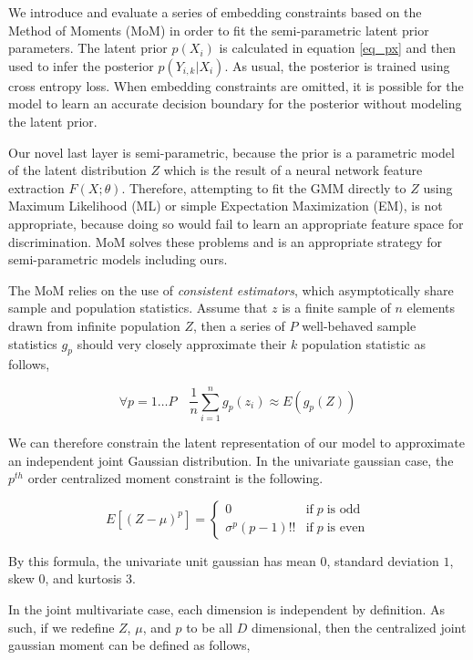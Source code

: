\documentclass[10pt,twocolumn,letterpaper]{article}
\begin{document}
We introduce and evaluate a series of embedding constraints based on the Method of Moments (MoM) \cite{pearson1936method} in order to fit the semi-parametric latent prior parameters.  
The latent prior $p(X_i)$ is calculated in equation \ref{eq_px} and then used to infer the posterior $p(Y_{i,k}|X_i)$.
As usual, the posterior is trained using cross entropy loss.  
When embedding constraints are omitted, it is possible for the model to learn an accurate decision boundary for the posterior without modeling the latent prior.

Our novel last layer is semi-parametric, because the prior is a parametric model of the latent distribution $Z$ which is the result of a neural network feature extraction $F(X;\theta)$. 
Therefore, attempting to fit the GMM directly to $Z$ using Maximum Likelihood (ML) or simple Expectation Maximization (EM), is not appropriate, because doing so would fail to learn an appropriate feature space for discrimination.
MoM solves these problems and is an appropriate strategy for semi-parametric models including ours.

The MoM relies on the use of \textit{consistent estimators}, which asymptotically share sample and population statistics.
Assume that $z$ is a finite sample of $n$ elements drawn from infinite population $Z$, then a series of $P$ well-behaved sample statistics $g_p$ should very closely approximate their $k$ population statistic as follows,

\begin{equation}
	\forall p=1 \dots P \quad
	\frac{1}{n} \sum_{i=1}^n g_p(z_i) \approx E(g_p(Z))
\end{equation}

We can therefore constrain the latent representation of our model to approximate an independent joint Gaussian distribution. 
In the univariate gaussian case, the $p^{th}$ order centralized moment constraint is the following.

\begin{equation}
	E\left[ (Z-\mu)^p \right] = 
	\begin{cases} 
		0 &  \text{if} \; p \; \text{is odd} \\
		\sigma^p(p - 1)!! & \text{if} \; p \; \text{is even}
	\end{cases}
\end{equation}

By this formula, the univariate unit gaussian has mean $0$, standard deviation $1$, skew $0$, and kurtosis $3$.

In the joint multivariate case, each dimension is independent by definition.  As such, if we redefine $Z$, $\mu$, and $p$ to be all $D$ dimensional, then the centralized joint gaussian moment can be defined as follows,
\end{document}

